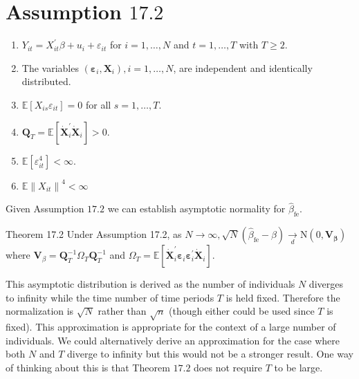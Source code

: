 \documentclass[10pt]{article}
\begin{document}
\section{Assumption $17.2$}
\begin{enumerate}
  \item $Y_{i t}=X_{i t}^{\prime} \beta+u_{i}+\varepsilon_{i t}$ for $i=1, \ldots, N$ and $t=1, \ldots, T$ with $T \geq 2$.

  \item The variables $\left(\boldsymbol{\varepsilon}_{i}, \boldsymbol{X}_{i}\right), i=1, \ldots, N$, are independent and identically distributed.

  \item $\mathbb{E}\left[X_{i s} \varepsilon_{i t}\right]=0$ for all $s=1, \ldots, T$.

  \item $\boldsymbol{Q}_{T}=\mathbb{E}\left[\dot{\boldsymbol{X}}_{i}^{\prime} \dot{\boldsymbol{X}}_{i}\right]>0$.

  \item $\mathbb{E}\left[\varepsilon_{i t}^{4}\right]<\infty$.

  \item $\mathbb{E}\left\|X_{i t}\right\|^{4}<\infty$

\end{enumerate}
Given Assumption $17.2$ we can establish asymptotic normality for $\widehat{\beta}_{\mathrm{fe}}$.

Theorem 17.2 Under Assumption 17.2, as $N \rightarrow \infty, \sqrt{N}\left(\widehat{\beta}_{\mathrm{fe}}-\beta\right) \underset{d}{\longrightarrow} \mathrm{N}\left(0, \boldsymbol{V}_{\boldsymbol{\beta}}\right)$ where $\boldsymbol{V}_{\beta}=\boldsymbol{Q}_{T}^{-1} \Omega_{T} \boldsymbol{Q}_{T}^{-1}$ and $\Omega_{T}=\mathbb{E}\left[\dot{\boldsymbol{X}}_{i}^{\prime} \boldsymbol{\varepsilon}_{i} \boldsymbol{\varepsilon}_{i}^{\prime} \dot{\boldsymbol{X}}_{i}\right]$.

This asymptotic distribution is derived as the number of individuals $N$ diverges to infinity while the time number of time periods $T$ is held fixed. Therefore the normalization is $\sqrt{N}$ rather than $\sqrt{n}$ (though either could be used since $T$ is fixed). This approximation is appropriate for the context of a large number of individuals. We could alternatively derive an approximation for the case where both $N$ and $T$ diverge to infinity but this would not be a stronger result. One way of thinking about this is that Theorem $17.2$ does not require $T$ to be large.
\end{document}
